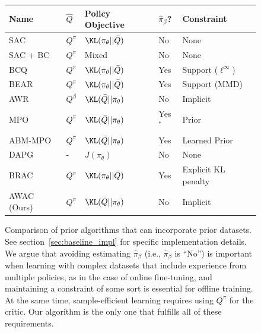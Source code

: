 \begin{figure}[H]
    \begin{centering}
        \footnotesize
        \begin{tabular}{ l||l|l|l|l  }
            Name & $\hat{Q}$ & Policy Objective & $\hat{\pi}_\beta$? & Constraint \\
            \hline
            SAC    & $Q^\pi$   & $\KL(\pi_\theta||\bar{Q})$   & No   &  None            \\
            SAC + BC & $Q^\pi$   & Mixed   & No   &  None            \\
            BCQ    & $Q^\pi$   & $\KL(\pi_\theta||\bar{Q})$   & Yes   &  Support ($\ell^\infty$)  \\
            BEAR   & $Q^\pi$   & $\KL(\pi_\theta||\bar{Q})$   & Yes   &  Support (MMD)   \\
            AWR    & $Q^\beta$ & $\KL(\bar{Q}||\pi_\theta)$   & No   &  Implicit        \\
            MPO    & $Q^\pi$   & $\KL(\bar{Q}||\pi_\theta)$   & Yes$^*$   &  Prior   \\
            ABM-MPO    & $Q^\pi$   & $\KL(\bar{Q}||\pi_\theta)$   & Yes   &  Learned Prior   \\
            DAPG   & -         & $J(\pi_\theta)$   & No   &  None            \\
            BRAC   & $Q^\pi$   & $\KL(\pi_\theta||\bar{Q})$   & Yes   &  Explicit KL penalty   \\
            AWAC (Ours)   & $Q^\pi$   & $\KL(\bar{Q}||\pi_\theta)$  & No    &  Implicit
        \end{tabular}
    \end{centering}
    
    \caption{Comparison of prior algorithms that can incorporate prior datasets. See section~\ref{sec:baseline_impl} for specific implementation details. We argue that avoiding estimating $\hat{\pi}_\beta$ (i.e., $\hat{\pi}_\beta$ is ``No'') is important when learning with complex datasets that include experience from multiple policies, as in the case of online fine-tuning, and maintaining a constraint of some sort is essential for offline training. At the same time, sample-efficient learning requires using $Q^\pi$ for the critic. Our algorithm is the only one that fulfills all of these requirements.}
    \label{fig:algo_table}
\end{figure}

